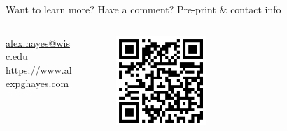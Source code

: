 \documentclass[final]{beamer}
\newlength{\sepwidth}
\newlength{\colwidth}
\newcommand{\separatorcolumn}{\begin{column}{\sepwidth}\end{column}}
\begin{document}
\begin{frame}[t]
\begin{columns}[t]
\begin{column}{\colwidth}
            \begin{block}{Want to learn more? Have a comment? Pre-print \& contact info}
                \nocite{hayes2024c}
                \printbibliography
                \begin{columns}
                    \begin{column}{0.4\textwidth}
                        \begin{center}
                            \url{alex.hayes@wisc.edu} \\
                            \url{https://www.alexpghayes.com}
                        \end{center}
                    \end{column}
                    \begin{column}{0.3\textwidth}
                        \begin{figure}
                            \centering
                            \includegraphics[width=0.45\textwidth]{./figures/arxiv-qr.png}
                        \end{figure}
                    \end{column}
                \end{columns}
            \end{block}
        \end{column}
        \separatorcolumn
    \end{columns}
\end{frame}
\end{document}
